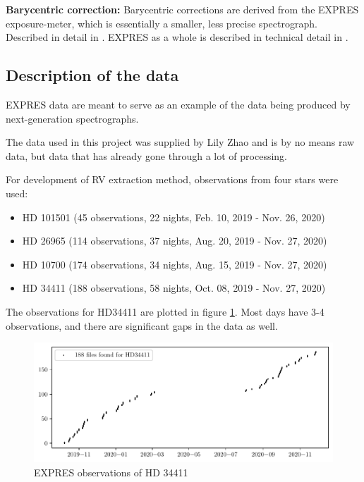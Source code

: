 \bigbreak
\noindent\textbf{Barycentric correction:}
Barycentric corrections are derived from the EXPRES exposure-meter, which is essentially a smaller, less precise spectrograph. Described in detail in \cite{barycentric_exposure_meter_blackman}. EXPRES as a whole is described in technical detail in \cite{EXPRES_technical_details_Jurgenson}.


\subsection{Description of the data}
EXPRES data are meant to serve as an example of the data being produced by next-generation spectrographs. 

The data used in this project was supplied by Lily Zhao and is by no means raw data, but data that has already gone through a lot of processing.

For development of RV extraction method, observations from four stars were used: 

\begin{itemize}
    \item HD 101501 (45 observations, 22 nights, Feb. 10, 2019 - Nov. 26, 2020)
    \item HD 26965 (114 observations, 37 nights, Aug. 20, 2019 - Nov. 27, 2020)
    \item HD 10700 (174 observations, 34 nights, Aug. 15, 2019 - Nov. 27, 2020)
    \item HD 34411 (188 observations, 58 nights, Oct. 08, 2019 - Nov. 27, 2020)
\end{itemize}

The observations for HD34411 are plotted in figure \ref{fig:dates_HD34411}. Most days have 3-4 observations, and there are significant gaps in the data as well.

\begin{figure}%
    \begin{wide}  
        \includegraphics[width=\textwidth]{figures/dates_HD34411.pdf}
        \caption{EXPRES observations of HD 34411}
    \label{fig:dates_HD34411}
    \end{wide}
\end{figure}
        
